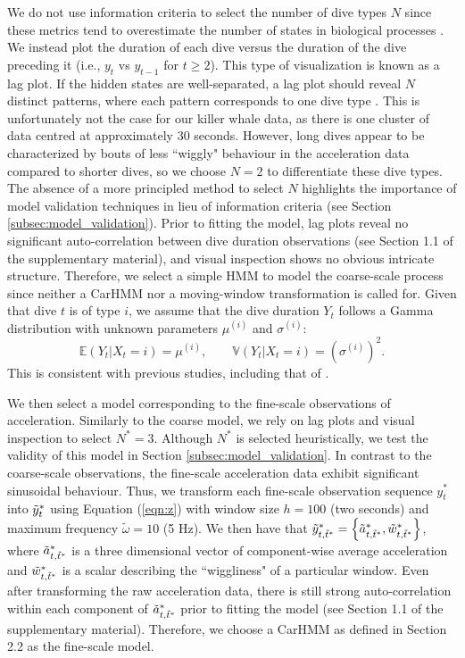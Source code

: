 We do not use information criteria to select the number of dive types $N$ since these metrics tend to overestimate the number of states in biological processes \citep{Pohle:2017}. We instead plot the duration of each dive versus the duration of the dive preceding it (i.e., $y_t$ vs $y_{t-1}$ for $t \geq 2$). This type of visualization is known as a lag plot. If the hidden states are well-separated, a lag plot should reveal $N$ distinct patterns, where each pattern corresponds to one dive type \citep{Lawler:2019}. This is unfortunately not the case for our killer whale data, as there is one cluster of data centred at approximately $30$ seconds. However, long dives appear to be characterized by bouts of less ``wiggly" behaviour in the acceleration data compared to shorter dives, so we choose $N = 2$ to differentiate these dive types. The absence of a more principled method to select $N$ highlights the importance of model validation techniques in lieu of information criteria (see Section \ref{subsec:model_validation}).
%
Prior to fitting the model, lag plots reveal no significant auto-correlation between dive duration observations (see Section 1.1 of the supplementary material), and visual inspection shows no obvious intricate structure. Therefore, we select a simple HMM to model the coarse-scale process since neither a CarHMM nor a moving-window transformation is called for.
%
Given that dive $t$ is of type $i$, we assume that the dive duration $Y_t$ follows a Gamma distribution with unknown parameters $\mu^{(i)}$ and $\sigma^{(i)}$:
%
$$\mathbb{E}(Y_t|X_t = i) = \mu^{(i)}, \qquad \mathbb{V}(Y_t|X_t = i) = \left(\sigma^{(i)}\right)^2.$$
%
This is consistent with previous studies, including that of \citet{Barajas:2017}. 
%

We then select a model corresponding to the fine-scale observations of acceleration. Similarly to the coarse model, we rely on lag plots and visual inspection to select $N^*=3$. Although $N^*$ is selected heuristically, we test the validity of this model in Section \ref{subsec:model_validation}.
%
In contrast to the coarse-scale observations, the fine-scale acceleration data exhibit significant sinusoidal behaviour. Thus, we transform each fine-scale observation sequence $y_t^*$ into $\tilde{y}^*_t$ using Equation (\ref{eqn:z}) with window size $h=100$ (two seconds) and maximum frequency $\tilde{\omega}=10$ (5 Hz). 
We then have that $\tilde{y}^*_{t,\tilde t^*} = \left\{\tilde{a}^*_{t,\tilde t^*},\tilde{w}^*_{t,\tilde t^*}\right\}$, where $\tilde{a}^*_{t,\tilde t^*}$ is a three dimensional vector of component-wise average acceleration and $\tilde{w}^*_{t,\tilde t^*}$ is a scalar describing the ``wiggliness" of a particular window. Even after transforming the raw acceleration data, there is still strong auto-correlation within each component of $\tilde{a}^*_{t,\tilde t^*}$ prior to fitting the model (see Section 1.1 of the supplementary material). Therefore, we choose a CarHMM as defined in Section 2.2 as the fine-scale model.

